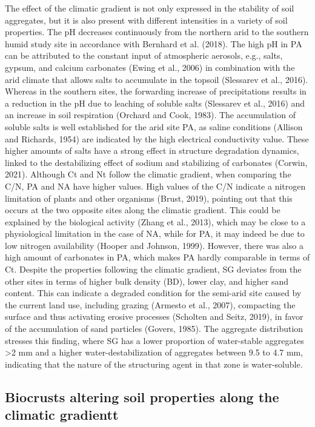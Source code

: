 The effect of the climatic gradient is not only expressed in the stability of soil aggregates, but it is also present with different intensities in a variety of soil properties. The pH decreases continuously from the northern arid to the southern humid study site in accordance with Bernhard et al. (2018). The high pH in PA can be attributed to the constant input of atmospheric aerosols, e.g., salts, gypsum, and calcium carbonates (Ewing et al., 2006) in combination with the arid climate that allows salts to accumulate in the topsoil (Slessarev et al., 2016). Whereas in the southern sites, the forwarding increase of precipitations results in a reduction in the pH due to leaching of soluble salts (Slessarev et al., 2016) and an increase in soil respiration (Orchard and Cook, 1983). The accumulation of soluble salts is well established for the arid site PA, as saline conditions (Allison and Richards, 1954) are indicated by the high electrical conductivity value. These higher amounts of salts have a strong effect in structure degradation dynamics, linked to the destabilizing effect of sodium and stabilizing of carbonates (Corwin, 2021). Although Ct and Nt follow the climatic gradient, when comparing the C/N, PA and NA have higher values. High values of the C/N indicate a nitrogen limitation of plants and other organisms (Brust, 2019), pointing out that this occurs at the two opposite sites along the climatic gradient. This could be explained by the biological activity (Zhang et al., 2013), which may be close to a physiological limitation in the case of NA, while for PA, it may indeed be due to low nitrogen availability (Hooper and Johnson, 1999). However, there was also a high amount of carbonates in PA, which makes PA hardly comparable in terms of Ct. Despite the properties following the climatic gradient, SG deviates from the other sites in terms of higher bulk density (BD), lower clay, and higher sand content. This can indicate a degraded condition for the semi-arid site caused by the current land use, including grazing (Armesto et al., 2007), compacting the surface and thus activating erosive processes (Scholten and Seitz, 2019), in favor of the accumulation of sand particles (Govers, 1985). The aggregate distribution stresses this finding, where SG has a lower proportion of water-stable aggregates >2 mm and a higher water-destabilization of aggregates between 9.5 to 4.7 mm, indicating that the nature of the structuring agent in that zone is water-soluble.


\subsection{Biocrusts altering soil properties along the climatic gradientt}

